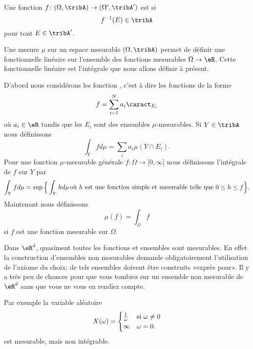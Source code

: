 Une fonction \( f\colon (\Omega,\tribA)\to (\Omega',\tribA')\) est  si 
\begin{equation}
    f^{-1}(E)\in\tribA
\end{equation}
pour tout \( E\in\tribA'\).


Une mesure \( \mu\) sur un espace mesurable \( (\Omega,\tribA)\) permet de définir une fonctionnelle linéaire sur l'ensemble des fonctions mesurables \( \Omega\to \eR\). Cette fonctionnelle linéaire est l'intégrale que nous allons définir à présent.

D'abord nous considérons les fonction , c'est à dire les fonctions de la forme
\begin{equation}
    f=\sum_{i=1}^Na_i\caract_{E_i}
\end{equation}
où \( a_i\in\eR\) tandis que les \( E_i\) sont des ensembles \( \mu\)-mesurables. Si \( Y\in \tribA\) nous définissons
\begin{equation}
    \int_Yfd\mu=\sum_ia_i\mu(Y\cap E_i).
\end{equation}
Pour une fonction \( \mu\)-mesurable générale \( f\colon \Omega\to \mathopen[ 0 , \infty \mathclose]\) nous définissons l'intégrale de \( f\) sur \( Y\) par
\begin{equation}        \label{EqDefintYfdmu}
    \int_Yfd\mu=\sup\Big\{ \int_Yhd\mu\,\text{où \( h\) est une fonction simple et mesurable telle que \( 0\leq h\leq f\)} \Big\}.
\end{equation}
Maintenant nous définissons
\begin{equation}
    \mu(f)=\int_{\Omega}f
\end{equation}
si \( f\) est une fonction mesurable sur \( \Omega\).

\begin{remark}
    Dans \( \eR^d\), quasiment toutes les fonctions et ensembles sont mesurables. En effet la construction d'ensembles non mesurables demande obligatoirement l'utilisation de l'axiome du choix; de tels ensembles doivent être construits «exprès pour». Il y a très peu de chances pour que vous tombiez sur un ensemble non mesurable de \( \eR^d\) sans que vous ne vous en rendiez compte.

    Par exemple la variable aléatoire 
    \begin{equation}
        X(\omega)=\begin{cases}
            \frac{1}{ \omega }    &   \text{si $ \omega\neq 0$}\\
            \infty    &    \text{$\omega=0$}.
        \end{cases}
    \end{equation}
    est mesurable, mais non intégrable.
\end{remark}

